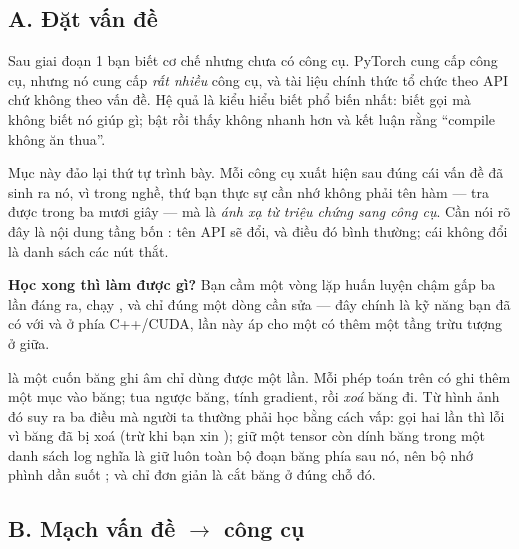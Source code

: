 \documentclass[../../../deep_learning.tex]{subfiles}
\begin{document}
\subsection{A. Đặt vấn đề}
Sau giai đoạn 1 bạn biết cơ chế nhưng chưa có công cụ. PyTorch cung cấp công cụ, nhưng nó cung cấp \emph{rất nhiều} công cụ, và tài liệu chính thức tổ chức theo API chứ không theo vấn đề. Hệ quả là kiểu hiểu biết phổ biến nhất: biết gọi  mà không biết nó giúp gì; bật  rồi thấy không nhanh hơn và kết luận rằng ``compile không ăn thua''.

Mục này đảo lại thứ tự trình bày. Mỗi công cụ xuất hiện sau đúng cái vấn đề đã sinh ra nó, vì trong nghề, thứ bạn thực sự cần nhớ không phải tên hàm --- tra được trong ba mươi giây --- mà là \emph{ánh xạ từ triệu chứng sang công cụ}. Cần nói rõ đây là nội dung tầng bốn : tên API sẽ đổi, và điều đó bình thường; cái không đổi là danh sách các nút thắt.


\textbf{Học xong thì làm được gì?} Bạn cầm một vòng lặp huấn luyện chậm gấp ba lần đáng ra, chạy , và chỉ đúng một dòng cần sửa --- đây chính là kỹ năng bạn đã có với  và  ở phía C++/CUDA, lần này áp cho một  có thêm một tầng trừu tượng ở giữa.

\begin{trucgiac}
 là một cuốn băng ghi âm chỉ dùng được một lần. Mỗi phép toán trên  có  ghi thêm một mục vào băng;  tua ngược băng, tính gradient, rồi \emph{xoá} băng đi. Từ hình ảnh đó suy ra ba điều mà người ta thường phải học bằng cách vấp: gọi  hai lần thì lỗi vì băng đã bị xoá (trừ khi bạn xin ); giữ một tensor còn dính băng trong một danh sách log nghĩa là giữ luôn toàn bộ đoạn băng phía sau nó, nên bộ nhớ phình dần suốt ; và  chỉ đơn giản là cắt băng ở đúng chỗ đó.
\end{trucgiac}

\subsection{B. Mạch vấn đề \(\rightarrow\) công cụ}
\end{document}
